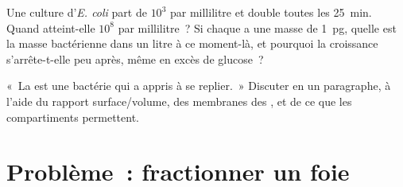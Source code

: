 \begin{exercise}[$\star\star\star$]\label{exo:b1:cell-unit-of-life:11}
Une culture d'\emph{E. coli} part de $10^3$  par millilitre et
double toutes les \qty{25}{min}. Quand atteint-elle $10^8$ par
millilitre~? Si chaque  a une masse de \qty{1}{pg}, quelle est la
masse bactérienne dans un litre à ce moment-là, et pourquoi la
croissance s'arrête-t-elle peu après, même en excès de glucose~?
\end{exercise}

\begin{exercise}[$\star\star\star$]\label{exo:b1:cell-unit-of-life:12}
«~La  est une bactérie qui a appris à se replier.~»
Discuter en un paragraphe, à l'aide du rapport surface/volume, des
membranes des , et de ce que les compartiments permettent.
\end{exercise}

\section{Problème~: fractionner un foie}


